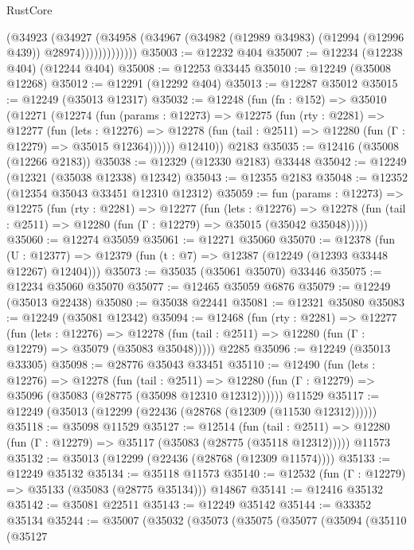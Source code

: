 \begin{lexlean}{RustCore}
\begin{coremodule}
                    (@34923
                      (@34927
                        (@34958
                          (@34967 (@34982 (@12989 @34983) (@12994 (@12996 @439)) @28974)))))))))))))
@35003 := @12232 @404
@35007 := @12234 (@12238 @404) (@12244 @404)
@35008 := @12253 @33445
@35010 := @12249 (@35008 @12268)
@35012 := @12291 (@12292 @404)
@35013 := @12287 @35012
@35015 := @12249 (@35013 @12317)
@35032 := @12248
    (fun (fn : @152) =>
    @35010
      (@12271
        (@12274
          (fun (params : @12273) =>
          @12275
            (fun (rty : @2281) =>
            @12277
              (fun (lets : @12276) =>
              @12278 (fun (tail : @2511) => @12280 (fun (Γ : @12279) => @35015 @12364))))))
        @12410))
    @2183
@35035 := @12416 (@35008 (@12266 @2183))
@35038 := @12329 (@12330 @2183) @33448
@35042 := @12249 (@12321 (@35038 @12338) @12342)
@35043 := @12355 @2183
@35048 := @12352 (@12354 @35043 @33451 @12310 @12312)
@35059 := fun (params : @12273) =>
  @12275
    (fun (rty : @2281) =>
    @12277
      (fun (lets : @12276) =>
      @12278 (fun (tail : @2511) => @12280 (fun (Γ : @12279) => @35015 (@35042 @35048)))))
@35060 := @12274 @35059
@35061 := @12271 @35060
@35070 := @12378
    (fun (U : @12377) => @12379 (fun (t : @7) => @12387 (@12249 (@12393 @33448 @12267) @12404)))
@35073 := @35035 (@35061 @35070) @33446
@35075 := @12234 @35060 @35070
@35077 := @12465 @35059 @6876
@35079 := @12249 (@35013 @22438)
@35080 := @35038 @22441
@35081 := @12321 @35080
@35083 := @12249 (@35081 @12342)
@35094 := @12468
    (fun (rty : @2281) =>
    @12277
      (fun (lets : @12276) =>
      @12278 (fun (tail : @2511) => @12280 (fun (Γ : @12279) => @35079 (@35083 @35048)))))
    @2285
@35096 := @12249 (@35013 @33305)
@35098 := @28776 @35043 @33451
@35110 := @12490
    (fun (lets : @12276) =>
    @12278
      (fun (tail : @2511) =>
      @12280 (fun (Γ : @12279) => @35096 (@35083 (@28775 (@35098 @12310 @12312))))))
    @11529
@35117 := @12249 (@35013 (@12299 (@22436 (@28768 (@12309 (@11530 @12312))))))
@35118 := @35098 @11529
@35127 := @12514
    (fun (tail : @2511) => @12280 (fun (Γ : @12279) => @35117 (@35083 (@28775 (@35118 @12312)))))
    @11573
@35132 := @35013 (@12299 (@22436 (@28768 (@12309 @11574))))
@35133 := @12249 @35132
@35134 := @35118 @11573
@35140 := @12532 (fun (Γ : @12279) => @35133 (@35083 (@28775 @35134))) @14867
@35141 := @12416 @35132
@35142 := @35081 @22511
@35143 := @12249 @35142
@35144 := @33352 @35134
@35244 := @35007
    (@35032
      (@35073
        (@35075
          (@35077
            (@35094
              (@35110
                (@35127

\end{coremodule}
\end{lexlean}
